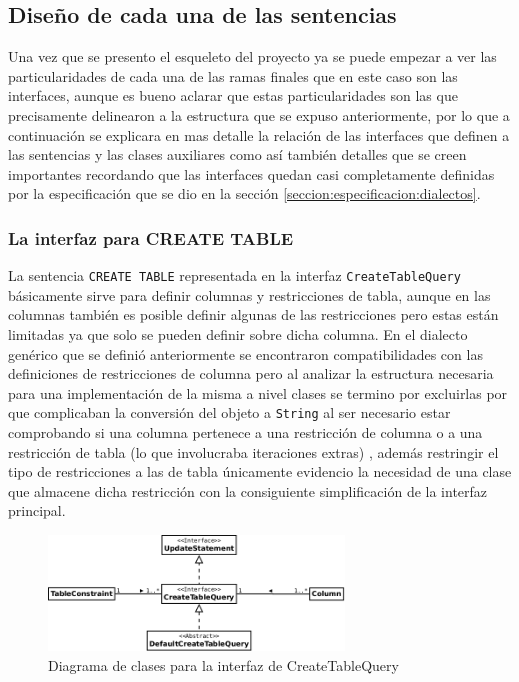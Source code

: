 \subsection{Diseño de cada una de las sentencias}
Una vez que se presento el esqueleto del proyecto ya se puede empezar a ver las particularidades de cada una de las ramas finales que en este caso son las interfaces, aunque es bueno aclarar que estas particularidades son las que precisamente delinearon a la estructura que se expuso anteriormente, por lo que a continuación se explicara en mas detalle la relación de las interfaces que definen a las sentencias y las clases auxiliares como así también detalles que se creen importantes recordando que las interfaces quedan casi completamente definidas por la especificación que se dio en la sección \ref{seccion:especificacion:dialectos}.
%
\subsubsection{La interfaz para CREATE TABLE}
La sentencia \verb=CREATE TABLE= representada en la interfaz \verb=CreateTableQuery= básicamente sirve para definir columnas y restricciones de tabla, aunque en las columnas también es posible definir algunas de las restricciones pero estas están limitadas ya que solo se pueden definir sobre dicha columna. En el dialecto genérico que se definió anteriormente se encontraron compatibilidades con las definiciones de restricciones de columna pero al analizar la estructura necesaria para una implementación de la misma a nivel clases se termino por excluirlas por que complicaban la conversión del objeto a \verb=String= al ser necesario estar comprobando si una columna pertenece a una restricción de columna o a una restricción de tabla (lo que involucraba iteraciones extras) , además restringir el tipo de restricciones a las de tabla únicamente evidencio la  necesidad de una clase que almacene dicha restricción con la consiguiente simplificación de la interfaz principal.
%
\begin{figure}
  \centering
    \includegraphics[width=0.7\textwidth]{figuras/jdbgm-dc-createtable.png}
  \caption{Diagrama de clases para la interfaz de CreateTableQuery}
  \label{fig:dc-createtable}
\end{figure}

